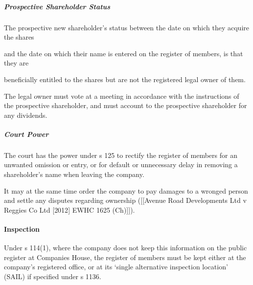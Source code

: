 \documentclass[
]{article}
\begin{document}
\hypertarget{prospective-shareholder-status}{%
\subparagraph{Prospective Shareholder
Status}\label{prospective-shareholder-status}}

The prospective new shareholder's status between the date on which they
acquire the shares

and the date on which their name is entered on the register of members,
is that they are

beneficially entitled to the shares but are not the registered legal
owner of them.

The legal owner must vote at a meeting in accordance with the
instructions of the prospective shareholder, and must account to the
prospective shareholder for any dividends.

\hypertarget{court-power}{%
\subparagraph{Court Power}\label{court-power}}

The court has the power under s 125 to rectify the register of members
for an unwanted omission or entry, or for default or unnecessary delay
in removing a shareholder's name when leaving the company.

It may at the same time order the company to pay damages to a wronged
person and settle any disputes regarding ownership ({[}{[}Avenue Road
Developments Ltd v Reggies Co Ltd {[}2012{]} EWHC 1625 (Ch){]}{]}).

\hypertarget{inspection}{%
\paragraph{Inspection}\label{inspection}}

Under s 114(1), where the company does not keep this information on the
public register at Companies House, the register of members must be kept
either at the company's registered office, or at its `single alternative
inspection location' (SAIL) if specified under s 1136.
\end{document}
